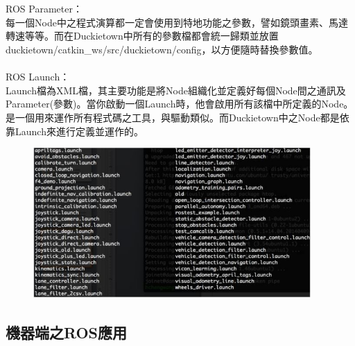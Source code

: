 \documentclass{article}
\begin{document}
\\
\\ROS Parameter：
\\每一個Node中之程式演算都一定會使用到特地功能之參數，譬如鏡頭畫素、馬達轉速等等。而在Duckietown中所有的參數檔都會統一歸類並放置duckietown/catkin\_ws/src/duckietown/config，以方便隨時替換參數值。
\\
\\ROS Launch：
\\Launch檔為XML檔，其主要功能是將Node組織化並定義好每個Node間之通訊及Parameter(參數)。當你啟動一個Launch時，他會啟用所有該檔中所定義的Node。是一個用來運作所有程式碼之工具，與驅動類似。而Duckietown中之Node都是依靠Launch來進行定義並運作的。

\begin{figure}[htp]
    \begin{center}
        \includegraphics[width=300pt]{pic/圖片23.jpg}
    \end{center}
\end{figure}



\subsection{機器端之ROS應用}
\end{document}
